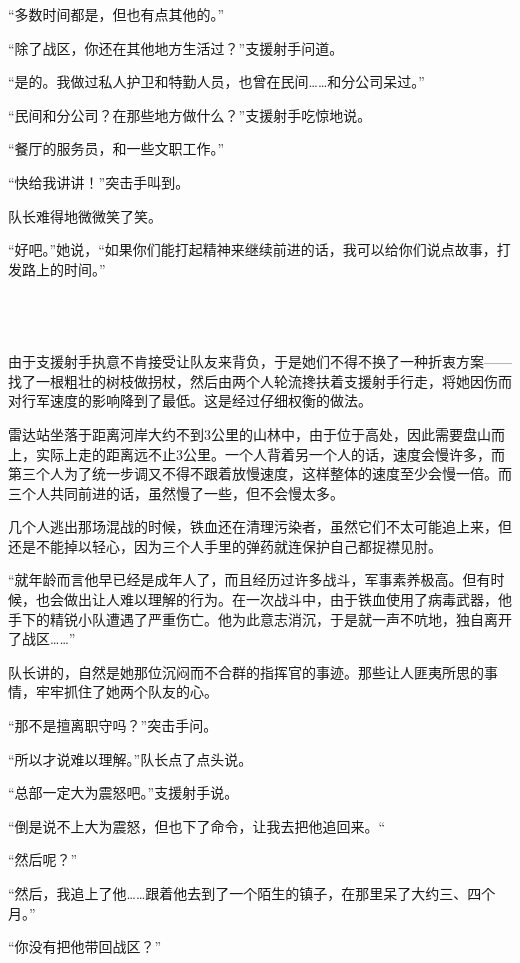“多数时间都是，但也有点其他的。”

“除了战区，你还在其他地方生活过？”支援射手问道。

“是的。我做过私人护卫和特勤人员，也曾在民间……和分公司呆过。”

“民间和分公司？在那些地方做什么？”支援射手吃惊地说。

“餐厅的服务员，和一些文职工作。”

“快给我讲讲！”突击手叫到。

队长难得地微微笑了笑。

“好吧。”她说，“如果你们能打起精神来继续前进的话，我可以给你们说点故事，打发路上的时间。”



 \section*{}

由于支援射手执意不肯接受让队友来背负，于是她们不得不换了一种折衷方案——找了一根粗壮的树枝做拐杖，然后由两个人轮流搀扶着支援射手行走，将她因伤而对行军速度的影响降到了最低。这是经过仔细权衡的做法。

雷达站坐落于距离河岸大约不到3公里的山林中，由于位于高处，因此需要盘山而上，实际上走的距离远不止3公里。一个人背着另一个人的话，速度会慢许多，而第三个人为了统一步调又不得不跟着放慢速度，这样整体的速度至少会慢一倍。而三个人共同前进的话，虽然慢了一些，但不会慢太多。

几个人逃出那场混战的时候，铁血还在清理污染者，虽然它们不太可能追上来，但还是不能掉以轻心，因为三个人手里的弹药就连保护自己都捉襟见肘。

“就年龄而言他早已经是成年人了，而且经历过许多战斗，军事素养极高。但有时候，也会做出让人难以理解的行为。在一次战斗中，由于铁血使用了病毒武器，他手下的精锐小队遭遇了严重伤亡。他为此意志消沉，于是就一声不吭地，独自离开了战区……”

队长讲的，自然是她那位沉闷而不合群的指挥官的事迹。那些让人匪夷所思的事情，牢牢抓住了她两个队友的心。

“那不是擅离职守吗？”突击手问。

“所以才说难以理解。”队长点了点头说。

“总部一定大为震怒吧。”支援射手说。

“倒是说不上大为震怒，但也下了命令，让我去把他追回来。“

“然后呢？”

“然后，我追上了他……跟着他去到了一个陌生的镇子，在那里呆了大约三、四个月。”

“你没有把他带回战区？”

